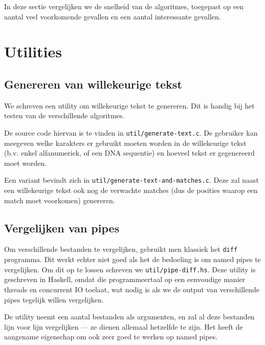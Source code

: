 \documentclass[a4paper,11pt]{article}
\begin{document}
In deze sectie vergelijken we de snelheid van de algoritmes, toegepast op een
aantal veel voorkomende gevallen en een aantal interessante gevallen.

\section{Utilities}

\subsection{Genereren van willekeurige tekst}
\label{generate-text}

We schreven een utility om willekeurige tekst te genereren. Dit is handig bij
het testen van de verschillende algoritmes.

De source code hiervan is te vinden in \verb#util/generate-text.c#. De gebruiker
kan meegeven welke karakters er gebruikt moeten worden in de willekeurige tekst
(b.v. enkel alfanumeriek, of een DNA sequentie) en hoeveel tekst er gegenereerd
moet worden.

\label{generate-text-and-matches}
Een variant bevindt zich in \verb#util/generate-text-and-matches.c#. Deze zal
naast een willekeurige tekst ook nog de verwachte matches (dus de posities
waarop een match moet voorkomen) genereren.

\subsection{Vergelijken van pipes}
\label{pipe-diff}

Om verschillende bestanden te vergelijken, gebruikt men klassiek het \verb#diff#
programma. Dit werkt echter niet goed als het de bedoeling is om named pipes
te vergelijken. Om dit op te lossen schreven we \verb#util/pipe-diff.hs#. Deze
utility is geschreven in Haskell, omdat die programmeertaal op een eenvoudige
manier threads en concurrent IO toelaat, wat nodig is als we de output van
verschillende pipes tegelijk willen vergelijken.

De utility neemt een aantal bestanden als argumenten, en zal al deze bestanden
lijn voor lijn vergelijken — ze dienen allemaal hetzelfde te zijn. Het heeft de
aangename eigenschap om ook zeer goed te werken op named pipes.
\end{document}

